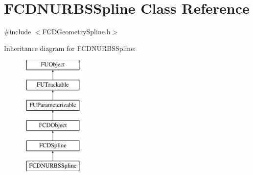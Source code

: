 \hypertarget{classFCDNURBSSpline}{
\section{FCDNURBSSpline Class Reference}
\label{classFCDNURBSSpline}
}


{\ttfamily \#include $<$FCDGeometrySpline.h$>$}

Inheritance diagram for FCDNURBSSpline:\begin{figure}[H]
\begin{center}
\leavevmode
\includegraphics[height=6.000000cm]{classFCDNURBSSpline}
\end{center}
\end{figure}
